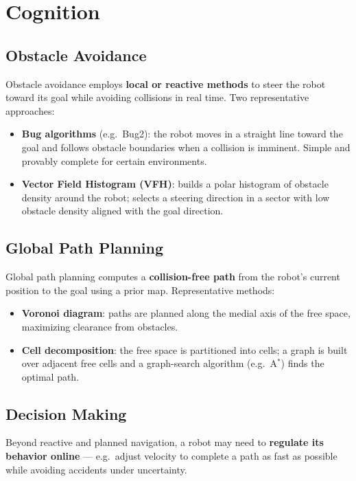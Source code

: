 \documentclass[11pt,a4paper]{article}
\theoremstyle{definition}
\theoremstyle{plain}
\theoremstyle{remark}
\begin{document}
\section{Cognition}

\subsection{Obstacle Avoidance}

Obstacle avoidance employs \textbf{local or reactive methods} to steer the robot toward its goal while avoiding collisions in real time. Two representative approaches:

\begin{itemize}
    \item \textbf{Bug algorithms} (e.g.\ Bug2): the robot moves in a straight line toward the goal and follows obstacle boundaries when a collision is imminent. Simple and provably complete for certain environments.
    \item \textbf{Vector Field Histogram (VFH)}: builds a polar histogram of obstacle density around the robot; selects a steering direction in a sector with low obstacle density aligned with the goal direction.
\end{itemize}

\subsection{Global Path Planning}

Global path planning computes a \textbf{collision-free path} from the robot's current position to the goal using a prior map. Representative methods:

\begin{itemize}
    \item \textbf{Voronoi diagram}: paths are planned along the medial axis of the free space, maximizing clearance from obstacles.
    \item \textbf{Cell decomposition}: the free space is partitioned into cells; a graph is built over adjacent free cells and a graph-search algorithm (e.g.\ A$^*$) finds the optimal path.
\end{itemize}

\subsection{Decision Making}

Beyond reactive and planned navigation, a robot may need to \textbf{regulate its behavior online} — e.g.\ adjust velocity to complete a path as fast as possible while avoiding accidents under uncertainty.
\end{document}
